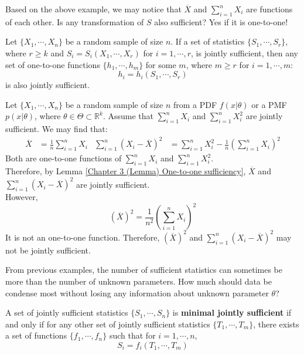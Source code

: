 \documentclass{huhtakm-template-book-v2}
\begin{document}
\newpage
Based on the above example, we may notice that $\overline{X}$ and $\sum_{i=1}^{n}X_{i}$ are functions of each other. Is any transformation of $S$ also sufficient? Yes if it is one-to-one!
\begin{lem}
	\label{Chapter 3 (Lemma) One-to-one sufficiency}
	Let $\{X_{1},\cdots,X_{n}\}$ be a random sample of size $n$. If a set of statistics $\{S_{1},\cdots,S_{r}\}$, where $r\geq k$ and $S_{i}=S_{i}(X_{1},\cdots,X_{r})$ for $i=1,\cdots,r$, is jointly sufficient, then any set of one-to-one functions $\{h_{1},\cdots,h_{m}\}$ for some $m$, where $m\geq r$ for $i=1,\cdots,m$:
	\begin{equation*}
		h_{i}=h_{i}(S_{1},\cdots,S_{r})
	\end{equation*}
	is also jointly sufficient.
\end{lem}
\begin{eg}
	Let $\{X_{1},\cdots,X_{n}\}$ be a random sample of size $n$ from a PDF $f(x|\theta)$ or a PMF $p(x|\theta)$, where $\theta\in\Theta\subset\mathbb{R}^{k}$. Assume that $\sum_{i=1}^{n}X_{i}$ and $\sum_{i=1}^{n}X_{i}^{2}$ are jointly sufficient. We may find that:
	\begin{align*}
		\overline{X}&=\frac{1}{n}\sum_{i=1}^{n}X_{i} & \sum_{i=1}^{n}(X_{i}-\overline{X})^{2}&=\sum_{i=1}^{n}X_{i}^{2}-\frac{1}{n}\left(\sum_{i=1}^{n}X_{i}\right)^{2}
	\end{align*}
	Both are one-to-one functions of $\sum_{i=1}^{n}X_{i}$ and $\sum_{i=1}^{n}X_{i}^{2}$.\\
	Therefore, by Lemma \ref{Chapter 3 (Lemma) One-to-one sufficiency}, $\overline{X}$ and $\sum_{i=1}^{n}(X_{i}-\overline{X})^{2}$ are jointly sufficient.\\
	However,
	\begin{equation*}
		(\overline{X})^{2}=\frac{1}{n^{2}}\left(\sum_{i=1}^{n}X_{i}\right)^{2}
	\end{equation*}
	It is not an one-to-one function. Therefore, $(\overline{X})^{2}$ and $\sum_{i=1}^{n}(X_{i}-\overline{X})^{2}$ may not be jointly sufficient.
\end{eg}
From previous examples, the number of sufficient statistics can sometimes be more than the number of unknown parameters. How much should data be condense most without losing any information about unknown parameter $\theta$?
\begin{defn}
	A set of jointly sufficient statistics $\{S_{1},\cdots,S_{n}\}$ is \textbf{minimal jointly sufficient} if and only if for any other set of jointly sufficient statistics $\{T_{1},\cdots,T_{m}\}$, there exists a set of functions $\{f_{1},\cdots,f_{n}\}$ such that for $i=1,\cdots,n$,
	\begin{equation*}
		S_{i}=f_{i}(T_{1},\cdots,T_{m})
	\end{equation*}
\end{defn}
\end{document}
